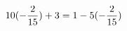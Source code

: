 \documentclass[preview]{standalone}
\begin{document}
\begin{align*}
\special{dvisvgm:raw <g id='unique000'>}10 (- \frac{2}{15}) + 3 = 1 - 5 (- \frac{2}{15})\special{dvisvgm:raw </g>}
\end{align*}
\end{document}
